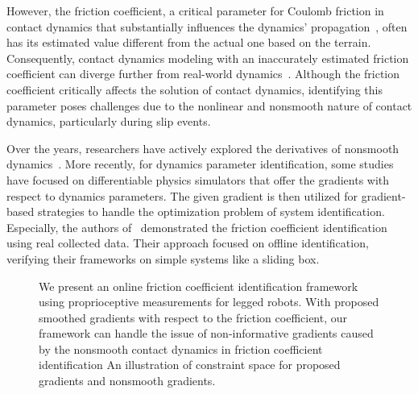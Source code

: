 However, the friction coefficient, a critical parameter for Coulomb friction in contact dynamics that substantially influences the dynamics' propagation~\cite{acosta2022validating}, often has its estimated value different from the actual one based on the terrain. Consequently, contact dynamics modeling with an inaccurately estimated friction coefficient can diverge further from real-world dynamics~\cite{varin2020constrained}.
Although the friction coefficient critically affects the solution of contact dynamics, identifying this parameter poses challenges due to the nonlinear and nonsmooth nature of contact dynamics, particularly during slip events.


Over the years, researchers have actively explored the derivatives of nonsmooth dynamics~\cite{tolsma2002hidden,kong2024saltation}. More recently, for dynamics parameter identification, some studies~\cite{werling2021fast,NEURIPS2018_842424a1,lidec2022differentiable} have focused on differentiable physics simulators that offer the gradients with respect to dynamics parameters. The given gradient is then utilized for gradient-based strategies to handle the optimization problem of system identification. Especially, the authors of~\cite{lidec2022differentiable,jatavallabhula2021gradsim} demonstrated the friction coefficient identification using real collected data. Their approach focused on offline identification, verifying their frameworks on simple systems like a sliding box.

\begin{figure}
    \centering
\hfill
    \caption{We present an online friction coefficient identification framework using proprioceptive measurements for legged robots. \protect{} With proposed smoothed gradients with respect to the friction coefficient, our framework can handle the issue of non-informative gradients caused by the nonsmooth contact dynamics in friction coefficient identification \protect{} An illustration of constraint space for proposed gradients and nonsmooth gradients.}
    \label{fig:wrong_cof_in_contact_model}
\end{figure}


